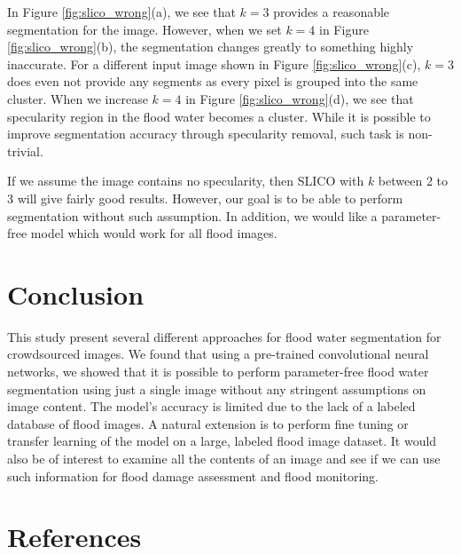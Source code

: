 \documentclass[review]{elsarticle}
\begin{document}
In Figure \ref{fig:slico_wrong}(a), we see that $k=3$ provides a reasonable segmentation for the image. However, when we set $k=4$ in Figure \ref{fig:slico_wrong}(b), the segmentation changes greatly to something highly inaccurate. For a different input image shown in Figure \ref{fig:slico_wrong}(c), $k=3$ does even not provide any segments as every pixel is grouped into the same cluster. When we increase $k=4$ in Figure \ref{fig:slico_wrong}(d), we see that specularity region in the flood water becomes a cluster. While it is possible to improve segmentation accuracy through specularity removal, such task is non-trivial.

If we assume the image contains no specularity, then SLICO with $k$ between 2 to 3 will give fairly good results. However, our goal is to be able to perform segmentation without such assumption. In addition, we would like a parameter-free model which would work for all flood images.


\section{Conclusion}\label{sec:conclusion}

This study present several different approaches for flood water segmentation for crowdsourced images. We found that using a pre-trained convolutional neural networks, we showed that it is possible to perform parameter-free flood water segmentation using just a single image without any stringent assumptions on image content. The model's accuracy is limited due to the lack of a labeled database of flood images. A natural extension is to perform fine tuning or transfer learning of the model on a large, labeled flood image dataset. It would also be of interest to examine all the contents of an image and see if we can use such information for flood damage assessment and flood monitoring.

\section*{References}



\end{document}
